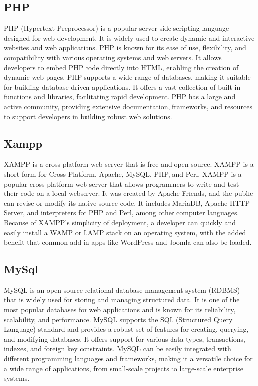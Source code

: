 \subsection*{PHP}
PHP (Hypertext Preprocessor) is a popular server-side scripting language designed for web development. It is widely used to create dynamic and interactive websites and web applications. PHP is known for its ease of use, flexibility, and compatibility with various operating systems and web servers. It allows developers to embed PHP code directly into HTML, enabling the creation of dynamic web pages. PHP supports a wide range of databases, making it suitable for building database-driven applications. It offers a vast collection of built-in functions and libraries, facilitating rapid development. PHP has a large and active community, providing extensive documentation, frameworks, and resources to support developers in building robust web solutions.

\subsection*{Xampp}
XAMPP is a cross-platform web server that is free and open-source. XAMPP is a short form for Cross-Platform, Apache, MySQL, PHP, and Perl. XAMPP is a popular cross-platform web server that allows programmers to write and test their code on a local webserver. It was created by Apache Friends, and the public can revise or modify its native source code. It includes MariaDB, Apache HTTP Server, and interpreters for PHP and Perl, among other computer languages. Because of XAMPP’s simplicity of deployment, a developer can quickly and easily install a WAMP or LAMP stack on an operating system, with the added benefit that common add-in apps like WordPress and Joomla can also be loaded.

\subsection*{MySql}
MySQL is an open-source relational database management system (RDBMS) that is widely used for storing and managing structured data. It is one of the most popular databases for web applications and is known for its reliability, scalability, and performance. MySQL supports the SQL (Structured Query Language) standard and provides a robust set of features for creating, querying, and modifying databases. It offers support for various data types, transactions, indexes, and foreign key constraints. MySQL can be easily integrated with different programming languages and frameworks, making it a versatile choice for a wide range of applications, from small-scale projects to large-scale enterprise systems.

